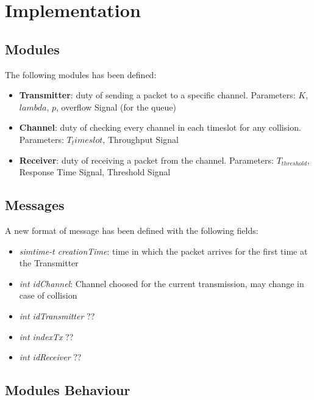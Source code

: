 \section{Implementation}
\subsection{Modules}
The following modules has been defined:
\begin{itemize}
	\item \textbf{Transmitter}: duty of sending a packet to a specific channel. Parameters: $K$, $lambda$, $p$, overflow Signal (for the queue)
	\item \textbf{Channel}: duty of checking every channel in each timeslot for any collision. Parameters: $T_timeslot$, Throughput Signal
	\item \textbf{Receiver}: duty of receiving a packet from the channel. Parameters: $T_{threshold}$, Response Time Signal, Threshold Signal
\end{itemize}
\subsection{Messages}
A new format of message has been defined with the following fields:
\begin{itemize}
	\item \textit{simtime-t creationTime}: time in which the packet arrives for the first time at the Transmitter
	\item \textit{int idChannel}: Channel choosed for the current transmission, may change in case of collision
	\item \textit{int idTransmitter} ??
	\item \textit{int indexTx} ??
	\item \textit{int idReceiver} ??
\end{itemize}
\subsection{Modules Behaviour}


